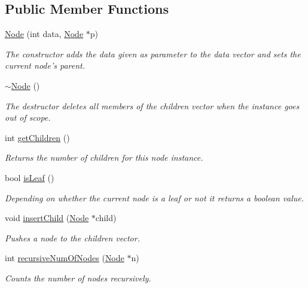 \subsection*{Public Member Functions}
\begin{DoxyCompactItemize}
\item 
\hyperlink{class_node_a9524dc2afb2e7343951a4244edfd7621}{Node} (int data, \hyperlink{class_node}{Node} $\ast$p)
\begin{DoxyCompactList}\small\item\em The constructor adds the data given as parameter to the data vector and sets the current node's parent. \end{DoxyCompactList}\item 
\hyperlink{class_node_aa0840c3cb5c7159be6d992adecd2097c}{$\sim$\-Node} ()
\begin{DoxyCompactList}\small\item\em The destructor deletes all members of the children vector when the instance goes out of scope. \end{DoxyCompactList}\item 
int \hyperlink{class_node_ac393c36db7ebed00ac390e97f9994a12}{get\-Children} ()
\begin{DoxyCompactList}\small\item\em Returns the number of children for this node instance. \end{DoxyCompactList}\item 
bool \hyperlink{class_node_a3a61dca67d5ad06cacb8c48eb6374973}{is\-Leaf} ()
\begin{DoxyCompactList}\small\item\em Depending on whether the current node is a leaf or not it returns a boolean value. \end{DoxyCompactList}\item 
void \hyperlink{class_node_a934927d1194b331bf502daea96513eef}{insert\-Child} (\hyperlink{class_node}{Node} $\ast$child)
\begin{DoxyCompactList}\small\item\em Pushes a node to the children vector. \end{DoxyCompactList}\item 
int \hyperlink{class_node_a7c98fb9df43ac39b5e74eda16434908b}{recursive\-Num\-Of\-Nodes} (\hyperlink{class_node}{Node} $\ast$n)
\begin{DoxyCompactList}\small\item\em Counts the number of nodes recursively. \end{DoxyCompactList}\item 

\end{DoxyCompactItemize}
